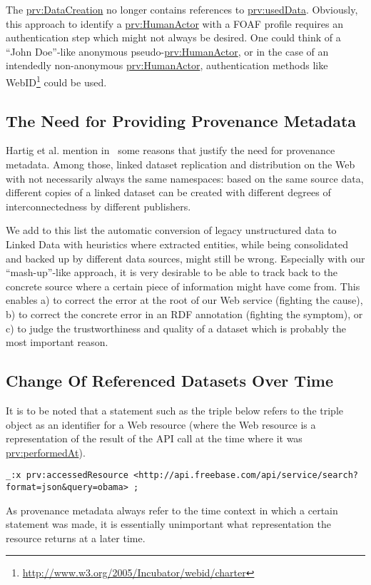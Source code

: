 \documentclass{acm_proc_article-sp}
\begin{document}
The \url{prv:DataCreation} no longer contains references to \url{prv:usedData}. Obviously, this approach to identify a
\url{prv:HumanActor} with a FOAF profile requires an authentication step which might not always be desired. One could
think of a ``John Doe''-like anonymous pseudo-\url{prv:HumanActor}, or in the case of an intendedly non-anonymous
\url{prv:HumanActor}, authentication methods like WebID\footnote{\url{http://www.w3.org/2005/Incubator/webid/charter}}
could be used.

\subsection{The Need for Providing Provenance Metadata}
Hartig et al. mention in~\cite{ipaw10:olaf} some reasons that justify the need for provenance metadata. Among those,
linked dataset replication and distribution on the Web with not necessarily always the same namespaces: based on the
same source data, different copies of a linked dataset can be created with different degrees of interconnectedness by
different publishers.

We add to this list the automatic conversion of legacy unstructured data to Linked Data with heuristics where extracted
entities, while being consolidated and backed up by different data sources, might still be wrong. Especially with our
``mash-up''-like approach, it is very desirable to be able to track back to the concrete source where a certain piece
of information might have come from. This enables a) to correct the error at the root of our Web service (fighting the
cause), b) to correct the concrete error in an RDF annotation (fighting the symptom), or c) to judge the
trustworthiness and quality of a dataset which is probably the most important reason.

\subsection{Change Of Referenced Datasets Over Time}                        \label{sec:change}
It is to be noted that a statement such as the triple below refers to the triple object as an identifier for a Web
resource (where the Web resource is a representation of the result of the API call at the time where it was
\url{prv:performedAt}).
\begin{lstlisting}
_:x prv:accessedResource <http://api.freebase.com/api/service/search?format=json&query=obama> ;
\end{lstlisting}
As provenance metadata always refer to the time context in which a certain statement was made, it is essentially
unimportant what representation the resource returns at a later time.
\end{document}
